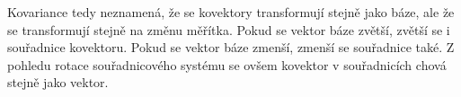 \documentclass[a5paper,12pt]{amsbook}
\theoremstyle{definition}
\begin{document}
Kovariance tedy neznamená, že se kovektory transformují stejně jako báze, ale
že se transformují stejně na změnu měřítka. Pokud se vektor báze zvětší, zvětší
se i souřadnice kovektoru. Pokud se vektor báze zmenší, zmenší se souřadnice
také. Z pohledu rotace souřadnicového systému se ovšem kovektor v souřadnicích
chová stejně jako vektor.
\end{document}
